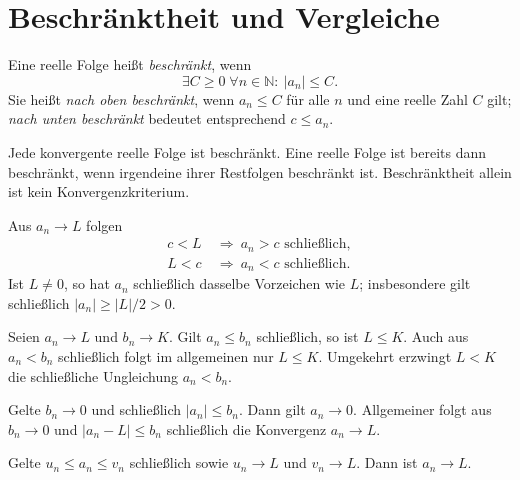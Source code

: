 \section{Beschränktheit und Vergleiche}

\begin{definition}
\label{b21guide:def:bounded}
Eine reelle Folge heißt \emph{beschränkt}, wenn
\[
 \exists C\geq0\;\forall n\in\mathbb N:\ |a_n|\leq C.
\]
Sie heißt \emph{nach oben beschränkt}, wenn $a_n\leq C$ für alle
$n$ und eine reelle Zahl $C$ gilt; \emph{nach unten beschränkt}
bedeutet entsprechend $c\leq a_n$.
\end{definition}

\begin{theorem}
\label{b21guide:thm:bounded}
Jede konvergente reelle Folge ist beschränkt.
Eine reelle Folge ist bereits dann beschränkt, wenn irgendeine
ihrer Restfolgen beschränkt ist.
Beschränktheit allein ist kein Konvergenzkriterium.
\end{theorem}

\begin{theorem}
\label{b21guide:thm:separation}
Aus $a_n\to L$ folgen
\[
 \begin{aligned}
 c<L&\ \Longrightarrow\ a_n>c\text{ schließlich},\\
 L<c&\ \Longrightarrow\ a_n<c\text{ schließlich}.
 \end{aligned}
\]
Ist $L\ne0$, so hat $a_n$ schließlich dasselbe Vorzeichen wie $L$;
insbesondere gilt schließlich $|a_n|\geq |L|/2>0$.
\end{theorem}

\begin{theorem}
\label{b21guide:thm:comparison}
Seien $a_n\to L$ und $b_n\to K$.
Gilt $a_n\leq b_n$ schließlich, so ist $L\leq K$.
Auch aus $a_n<b_n$ schließlich folgt im allgemeinen nur $L\leq K$.
Umgekehrt erzwingt $L<K$ die schließliche Ungleichung $a_n<b_n$.
\end{theorem}

\begin{theorem}
\label{b21guide:thm:majorant}
Gelte $b_n\to0$ und schließlich $|a_n|\leq b_n$.
Dann gilt $a_n\to0$.
Allgemeiner folgt aus $b_n\to0$ und
$|a_n-L|\leq b_n$ schließlich die Konvergenz $a_n\to L$.
\end{theorem}

\begin{theorem}[Einschließungsprinzip]
\label{b21guide:thm:squeeze}
Gelte $u_n\leq a_n\leq v_n$ schließlich sowie
$u_n\to L$ und $v_n\to L$. Dann ist $a_n\to L$.
\end{theorem}

